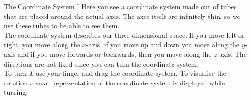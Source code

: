 \begin{surferPage}{The Coordinate System I}
Here you see a coordinate system made out of tubes that are placed around the actual axes. The axes itself are infinitely thin, so we use these tubes to be able to see them.\\
The coordinate system describes our three-dimensional space. If you move left or right, you move along the $x$-axis, if you move up and down you move along the $y$-axis and if you move forwards or backwards, then you move along the $z$-axis. The directions are not fixed since you can turn the coordinate system.\\
\vspace{0.3cm}
To turn it use your finger and drag the coordinate system. To visualise the rotation a small representation of the coordinate system is displayed while turning.
\end{surferPage}
